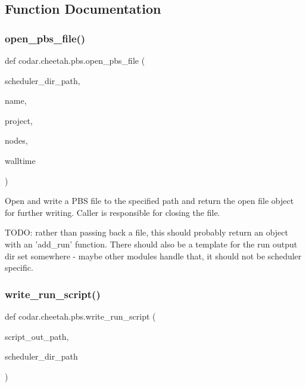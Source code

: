 \subsection{Function Documentation}
\mbox{\label{namespacecodar_1_1cheetah_1_1pbs_a2d1652f1349a664f93598c2ea3c20896}} 
\subsubsection{\texorpdfstring{open\+\_\+pbs\+\_\+file()}{open\_pbs\_file()}}
{\footnotesize\ttfamily def codar.\+cheetah.\+pbs.\+open\+\_\+pbs\+\_\+file (\begin{DoxyParamCaption}\item[{}]{scheduler\+\_\+dir\+\_\+path,  }\item[{}]{name,  }\item[{}]{project,  }\item[{}]{nodes,  }\item[{}]{walltime }\end{DoxyParamCaption})}

\begin{DoxyVerb}Open and write a PBS file to the specified path and return the open file
object for further writing. Caller is responsible for closing the file.

TODO: rather than passing back a file, this should probably return
an object with an 'add_run' function. There should also be a template
for the run output dir set somewhere - maybe other modules handle that,
it should not be scheduler specific.
\end{DoxyVerb}
 \mbox{\label{namespacecodar_1_1cheetah_1_1pbs_a911aa8a83bd8b0fd8f750ea66d410851}} 
\subsubsection{\texorpdfstring{write\+\_\+run\+\_\+script()}{write\_run\_script()}}
{\footnotesize\ttfamily def codar.\+cheetah.\+pbs.\+write\+\_\+run\+\_\+script (\begin{DoxyParamCaption}\item[{}]{script\+\_\+out\+\_\+path,  }\item[{}]{scheduler\+\_\+dir\+\_\+path }\end{DoxyParamCaption})}

